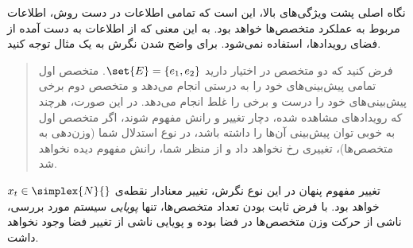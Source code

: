 \documentclass[a4paper,11px]{article}
\begin{document}
نگاه اصلی پشت ویژگی‌های بالا، این است که تمامی اطلاعات در دست روش، اطلاعات مربوط به عملکرد متخصص‌ها خواهد بود. به این معنی که از اطلاعات به دست آمده از فضای رویدادها، استفاده نمی‌شود. برای واضح شدن نگرش به یک مثال توجه کنید.
\begin{quote}
فرض کنید که دو متخصص در اختیار دارید 
$\set{E} = \{ e_1, e_2 \}$. 
متخصص اول تمامی پیش‌بینی‌های خود را به درستی انجام می‌دهد و متخصص دوم برخی پیش‌بینی‌های خود را درست و برخی را غلط انجام می‌دهد. در این صورت، هرچند که رویدادهای مشاهده شده، دچار تغییر و رانش مفهوم شوند، اگر متخصص اول به خوبی توان پیش‌بینی آن‌ها را داشته باشد، در نوع استدلال شما (وزن‌دهی به متخصص‌ها)، تغییری رخ نخواهد داد و از منظر شما، رانش مفهوم دیده نخواهد شد.
\end{quote}

تغییر مفهوم پنهان در این نوع نگرش، تغییر معنادار نقطه‌ی 
$x_t \in \simplex{N}{}$ 
خواهد بود. با فرض ثابت بودن تعداد متخصص‌ها، تنها 
\textit{
پویایی
} 
سیستم مورد بررسی، ناشی از حرکت وزن متخصص‌ها در فضا بوده و پویایی ناشی از تغییر فضا وجود نخواهد داشت.
\end{document}
